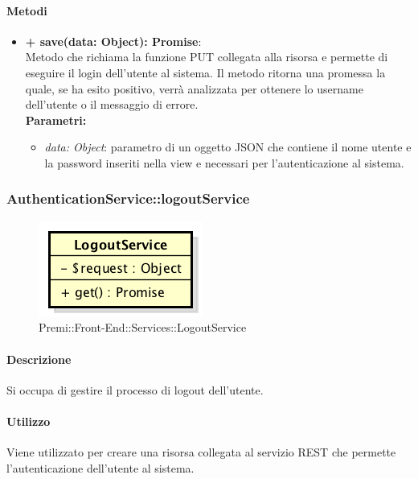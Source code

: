 		\paragraph{Metodi}
		\begin{itemize}
			\item \textbf{+ save(data: Object): Promise}:\\
			Metodo che richiama la funzione PUT collegata alla risorsa e permette di eseguire il login dell'utente al sistema. Il metodo ritorna una promessa la quale, se ha esito positivo, verrà analizzata per ottenere lo username dell'utente o il messaggio di errore. \\
			\textbf{Parametri:}\\
			\begin{itemize}
				\item \textit{data: Object}: parametro di un oggetto \gls{JSON} che contiene il nome utente e la password inseriti nella view e necessari per l'autenticazione al sistema.
			\end{itemize}
		\end{itemize}
\newpage
		
		
		\subsubsection{AuthenticationService::logoutService}
		\begin{figure}[h]
			\centering
				\includegraphics[width=0.4\linewidth]{img/premi_front_end_services_logoutservice}
			\caption[Premi::Front-End::Services::LogoutService]{Premi::Front-End::Services::LogoutService}
		\end{figure}
		
		\paragraph{Descrizione}
		Si occupa di gestire il processo di logout dell'utente.
		
		\paragraph{Utilizzo}
		Viene utilizzato per creare una risorsa collegata al servizio \gls{REST} che permette l'autenticazione dell'utente al sistema.
		
